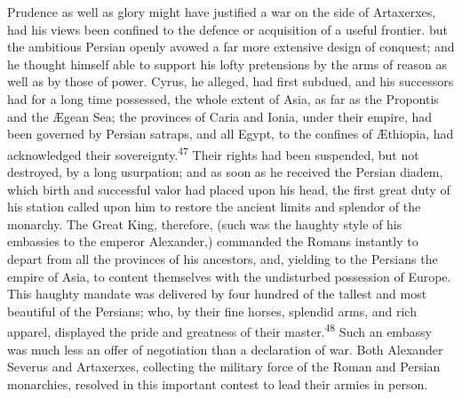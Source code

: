 


Prudence as well as glory might have justified a war on the side
of Artaxerxes, had his views been confined to the defence or
acquisition of a useful frontier. but the ambitious Persian
openly avowed a far more extensive design of conquest; and he
thought himself able to support his lofty pretensions by the arms
of reason as well as by those of power. Cyrus, he alleged, had
first subdued, and his successors had for a long time possessed,
the whole extent of Asia, as far as the Propontis and the Ægean
Sea; the provinces of Caria and Ionia, under their empire, had
been governed by Persian satraps, and all Egypt, to the confines
of Æthiopia, had acknowledged their sovereignty.\textsuperscript{47} Their rights
had been suspended, but not destroyed, by a long usurpation; and
as soon as he received the Persian diadem, which birth and
successful valor had placed upon his head, the first great duty
of his station called upon him to restore the ancient limits and
splendor of the monarchy. The Great King, therefore, (such was
the haughty style of his embassies to the emperor Alexander,)
commanded the Romans instantly to depart from all the provinces
of his ancestors, and, yielding to the Persians the empire of
Asia, to content themselves with the undisturbed possession of
Europe. This haughty mandate was delivered by four hundred of the
tallest and most beautiful of the Persians; who, by their fine
horses, splendid arms, and rich apparel, displayed the pride and
greatness of their master.\textsuperscript{48} Such an embassy was much less an
offer of negotiation than a declaration of war. Both Alexander
Severus and Artaxerxes, collecting the military force of the
Roman and Persian monarchies, resolved in this important contest
to lead their armies in person.


